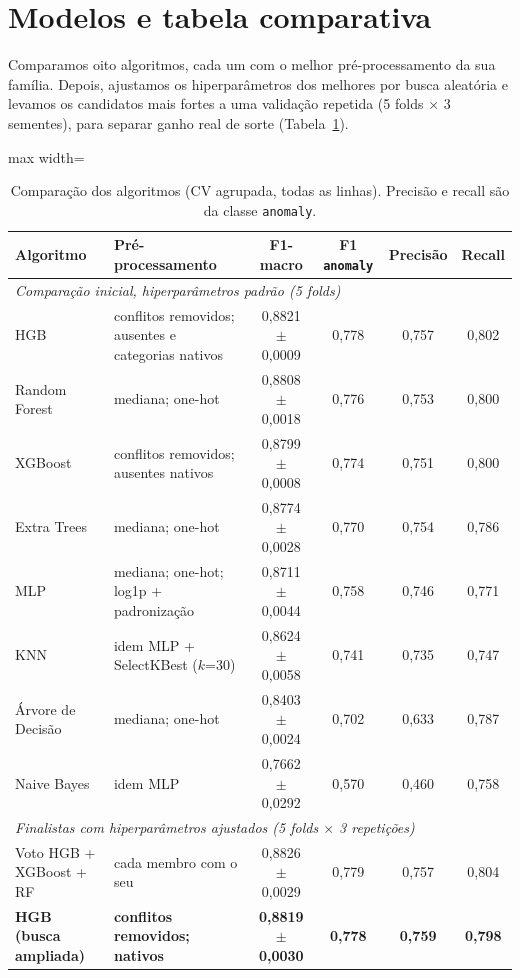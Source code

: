 \documentclass[11pt,a4paper]{article}
\begin{document}
\section{Modelos e tabela comparativa}

Comparamos oito algoritmos, cada um com o melhor pré-processamento da sua família. Depois, ajustamos os hiperparâmetros dos melhores por busca aleatória e levamos os candidatos mais fortes a uma validação repetida (5 folds $\times$ 3 sementes), para separar ganho real de sorte (Tabela~\ref{tab:modelos}).

\begin{table}[H]
\centering
\caption{Comparação dos algoritmos (CV agrupada, todas as linhas). Precisão e recall são da classe \texttt{anomaly}.}
\label{tab:modelos}
\small
\begin{adjustbox}{max width=\linewidth}
\begin{tabular}{llcccc}
\toprule
Algoritmo & Pré-processamento & F1-macro & F1 \texttt{anomaly} & Precisão & Recall \\
\midrule
\multicolumn{6}{l}{\emph{Comparação inicial, hiperparâmetros padrão (5 folds)}} \\
HGB & conflitos removidos; ausentes e categorias nativos & 0,8821 $\pm$ 0,0009 & 0,778 & 0,757 & 0,802 \\
Random Forest & mediana; one-hot & 0,8808 $\pm$ 0,0018 & 0,776 & 0,753 & 0,800 \\
XGBoost & conflitos removidos; ausentes nativos & 0,8799 $\pm$ 0,0008 & 0,774 & 0,751 & 0,800 \\
Extra Trees & mediana; one-hot & 0,8774 $\pm$ 0,0028 & 0,770 & 0,754 & 0,786 \\
MLP & mediana; one-hot; log1p + padronização & 0,8711 $\pm$ 0,0044 & 0,758 & 0,746 & 0,771 \\
KNN & idem MLP + SelectKBest ($k$=30) & 0,8624 $\pm$ 0,0058 & 0,741 & 0,735 & 0,747 \\
Árvore de Decisão & mediana; one-hot & 0,8403 $\pm$ 0,0024 & 0,702 & 0,633 & 0,787 \\
Naive Bayes & idem MLP & 0,7662 $\pm$ 0,0292 & 0,570 & 0,460 & 0,758 \\
\midrule
\multicolumn{6}{l}{\emph{Finalistas com hiperparâmetros ajustados (5 folds $\times$ 3 repetições)}} \\
Voto HGB + XGBoost + RF & cada membro com o seu & 0,8826 $\pm$ 0,0029 & 0,779 & 0,757 & 0,804 \\
\textbf{HGB (busca ampliada)} & \textbf{conflitos removidos; nativos} & \textbf{0,8819 $\pm$ 0,0030} & \textbf{0,778} & \textbf{0,759} & \textbf{0,798} \\

\end{tabular}
\end{adjustbox}
\end{table}
\end{document}
